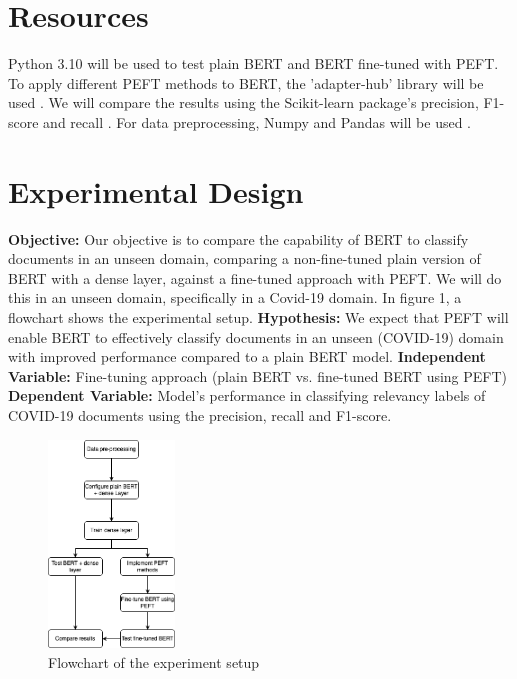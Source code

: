 \documentclass{IEEEtran}
\begin{document}
\section{Resources}
Python 3.10 will be used to test plain BERT and BERT fine-tuned with PEFT. To apply different PEFT methods to BERT, the 'adapter-hub' library will be used \cite{pfeiffer2020}. We will compare the results using the Scikit-learn package's precision, F1-score and recall \cite{scikit-learn}. For data preprocessing, Numpy and Pandas will be used \cite{harris2020array, mckinney2010data}. 

\section{Experimental Design}

\textbf{Objective:} Our objective is to compare the capability of BERT to classify documents in an unseen domain, comparing a non-fine-tuned plain version of BERT with a dense layer, against a fine-tuned approach with PEFT. We will do this in an unseen domain, specifically in a Covid-19 domain. In figure 1, a flowchart shows the experimental setup.
\textbf{Hypothesis:} We expect that PEFT will enable BERT to effectively classify documents in an unseen (COVID-19) domain with improved performance compared to a plain BERT model. 
\textbf{Independent Variable:} Fine-tuning approach (plain BERT vs. fine-tuned BERT using PEFT)
\textbf{Dependent Variable:} Model’s performance in classifying relevancy labels of COVID-19 documents using the precision, recall and F1-score.

\begin{figure}[h]
    \centering
    \includegraphics[width=0.30\textwidth]{flowchart.drawio.png}
    \caption{Flowchart of the experiment setup}
    \label{fig:my_image}
\end{figure}

\printbibliography
\end{document}
